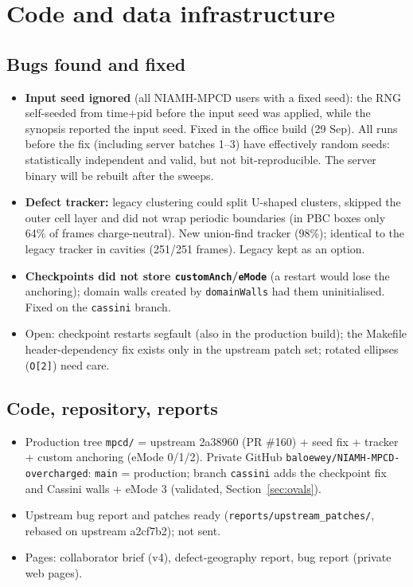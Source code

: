 \documentclass[11pt,a4paper]{article}
\begin{document}
\section{Code and data infrastructure}
\subsection{Bugs found and fixed}
{\sloppy\begin{itemize}
  \item \textbf{Input seed ignored} (all NIAMH-MPCD users with a fixed seed): the RNG self-seeded from time+pid before the
        input seed was applied, while the synopsis reported the input seed. Fixed in the office build (29 Sep).
        All runs before the fix (including server batches 1--3) have effectively random seeds: statistically
        independent and valid, but not bit-reproducible. The server binary will be rebuilt after the sweeps.
  \item \textbf{Defect tracker:} legacy clustering could split U-shaped clusters, skipped the outer cell layer and did
        not wrap periodic boundaries (in PBC boxes only 64\% of frames charge-neutral). New union-find tracker
        (98\%); identical to the legacy tracker in cavities (251/251 frames). Legacy kept as an option.
  \item \textbf{Checkpoints did not store \texttt{customAnch}/\texttt{eMode}} (a restart would lose the anchoring);
        domain walls created by \texttt{domainWalls} had them uninitialised. Fixed on the \texttt{cassini} branch.
  \item Open: checkpoint restarts segfault (also in the production build); the Makefile header-dependency fix
        exists only in the upstream patch set; rotated ellipses (\texttt{O[2]}) need care.
\end{itemize}\par}
\subsection{Code, repository, reports}
\begin{itemize}
  \item Production tree \texttt{mpcd/} = upstream 2a38960 (PR \#160) + seed fix + tracker + custom anchoring
        (eMode 0/1/2). Private GitHub \texttt{baloewey/NIAMH-MPCD-overcharged}: \texttt{main} = production;
        branch \texttt{cassini} adds the checkpoint fix and Cassini walls + eMode 3 (validated, Section~\ref{sec:ovals}).
  \item Upstream bug report and patches ready (\texttt{reports/upstream\_patches/}, rebased on upstream a2cf7b2); not sent.
  \item Pages: collaborator brief (v4), defect-geography report, bug report (private web pages).
\end{itemize}
\end{document}
